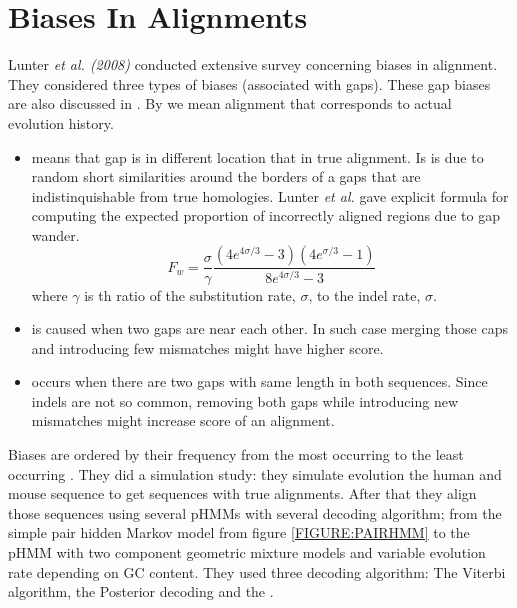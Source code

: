 

\section{Biases In Alignments}

Lunter {\it et al. (2008)} conducted extensive survey concerning biases in
alignment. They considered three types of biases (associated with gaps). These
gap biases are also discussed in \cite{Durbin1998} . By
 we mean alignment that corresponds to actual 
evolution history.
\begin{itemize}
\item {} means that gap is in different location that in
true alignment. Is is due to random short similarities around the borders of
a gaps that are indistinquishable from true homologies. Lunter {\it et al.} gave
explicit formula for computing the expected proportion of incorrectly aligned
regions due to gap wander. 
\[F_w =
\frac{\sigma}{\gamma}\frac{(4e^{4\sigma/3}-3)(4e^{\sigma/3}-1)}{8e^{4\sigma/3}-3}\]
where $\gamma$ is th ratio of the substitution rate, $\sigma$, to the indel
rate, $\sigma$.

\item {} is caused when two gaps are near each other.
In such case merging those caps and introducing few mismatches might have higher
score. 
\item {} occurs when there are two gaps with
same length in both sequences. Since indels are not so common, removing both
gaps while introducing new mismatches might increase score of an alignment.
\end{itemize}

Biases are ordered by their frequency from the most occurring to the least
occurring \cite{Lunter2008}. They did a simulation study: they simulate
evolution the human and mouse sequence to get sequences with true alignments.
After that they align those sequences using several pHMMs with several decoding
algorithm; from the simple pair hidden Markov model from figure
\ref{FIGURE:PAIRHMM} to the pHMM with two component geometric mixture models and
variable evolution rate depending on GC content. They used three decoding
algorithm: The Viterbi algorithm, the Posterior decoding and the
.

